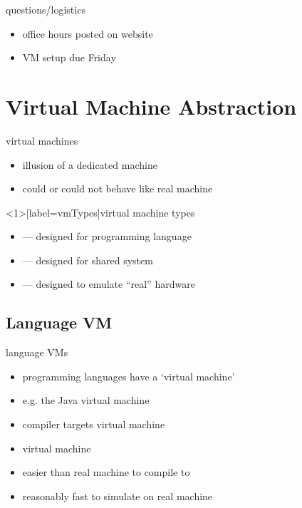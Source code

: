 \begin{frame}
    \titlepage
\end{frame}

\begin{frame}{questions/logistics}
    \begin{itemize}
    \item office hours posted on website
    \item VM setup due Friday
    \end{itemize}
\end{frame}

\section{Virtual Machine Abstraction}

\begin{frame}{virtual machines}
    \begin{itemize}
    \item illusion of a dedicated machine
    \item could or could not behave like real machine
    \end{itemize}
\end{frame}

\begin{frame}<1>[label=vmTypes]{virtual machine types}
    \begin{itemize}
        \item {} --- designed for programming language
        \item {} --- designed for shared system
        \item {} --- designed to emulate ``real'' hardware 
    \end{itemize}
\end{frame}

\subsection{Language VM}


\begin{frame}{language VMs}
    \begin{itemize}
    \item programming languages have a `virtual machine'
    \item e.g. the Java virtual machine
    \vspace{.5cm}
    \item compiler targets virtual machine
    \item virtual machine 
    \item easier than real machine to compile to
    \item reasonably fast to simulate on real machine
    \end{itemize}
\end{frame}

